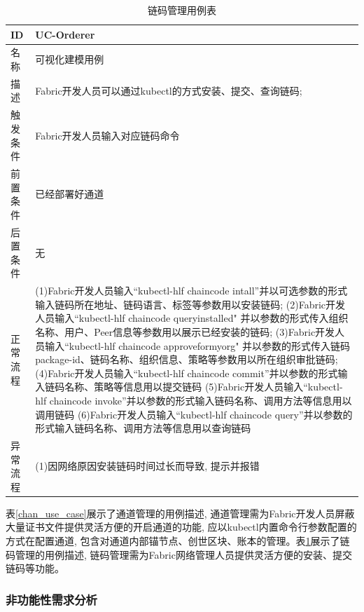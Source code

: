 {\footnotesize
\begin{longtable}[h]{m{60pt}|m{280pt}}
    \caption[链码管理用例表]{链码管理用例表} \label{cc_use_case} \\
        \hline  
        ID&UC-Orderer\\
        \hline
        名称&可视化建模用例\\
        \hline
        描述&Fabric开发人员可以通过kubectl的方式安装、提交、查询链码;\\
        \hline
        触发条件&Fabric开发人员输入对应链码命令\\
        \hline
        前置条件&已经部署好通道\\
        \hline
        后置条件&无\\
        \hline
        正常流程& (1)Fabric开发人员输入“kubectl-hlf chaincode intall”并以可选参数的形式输入链码所在地址、链码语言、标签等参数用以安装链码;
        \newline (2)Fabric开发人员输入“kubectl-hlf chaincode queryinstalled" 并以参数的形式传入组织名称、用户、Peer信息等参数用以展示已经安装的链码;
         \newline (3)Fabric开发人员输入“kubectl-hlf chaincode approveformyorg" 并以参数的形式传入链码package-id、链码名称、组织信息、策略等参数用以所在组织审批链码;
        \newline (4)Fabric开发人员输入“kubectl-hlf chaincode commit”并以参数的形式输入链码名称、策略等信息用以提交链码
        \newline (5)Fabric开发人员输入“kubectl-hlf chaincode invoke”并以参数的形式输入链码名称、调用方法等信息用以调用链码
        \newline (6)Fabric开发人员输入“kubectl-hlf chaincode query”并以参数的形式输入链码名称、调用方法等信息用以查询链码\\
        \hline 
        异常流程& (1)因网络原因安装链码时间过长而导致, 提示并报错\\
        \hline
    \end{longtable} 
}

表\ref{chan_use_case}展示了通道管理的用例描述, 通道管理需为Fabric开发人员屏蔽大量证书文件提供灵活方便的开启通道的功能, 应以kubectl内置命令行参数配置的方式在配置通道, 包含对通道内部锚节点、创世区块、账本的管理。表\ref{cc_use_case}展示了链码管理的用例描述, 链码管理需为Fabric网络管理人员提供灵活方便的安装、提交链码等功能。

\subsubsection{非功能性需求分析}

